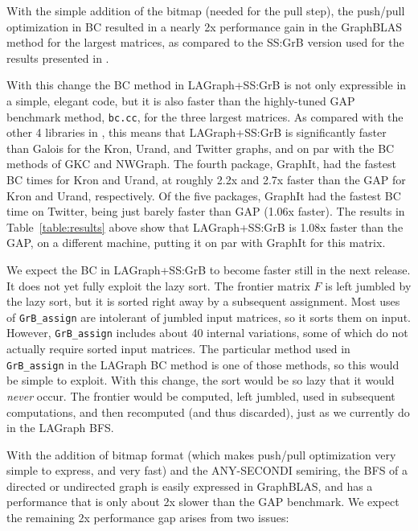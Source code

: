 
With the simple addition of the bitmap (needed for the pull step), the
push/pull optimization in BC resulted in a nearly 2x performance gain in the
GraphBLAS method for the largest matrices, as compared to the SS:GrB version
used for the results presented in \cite{DBLP:conf/iiswc/AzadABBCDDDDFGG20}.

With this change the BC method in LAGraph+SS:GrB is not only expressible in a
simple, elegant code, but it is also faster than the highly-tuned GAP benchmark
method, \verb'bc.cc', for the three largest matrices.  As compared with the
other 4 libraries in \cite{DBLP:conf/sc/BeamerAP12}, this means that
LAGraph+SS:GrB is significantly faster than Galois for the Kron, Urand, and
Twitter graphs, and on par with the BC methods of GKC and NWGraph.  The fourth
package, GraphIt, had the fastest BC times for Kron and Urand, at roughly 2.2x
and 2.7x faster than the GAP for Kron and Urand, respectively.  Of the five
packages, GraphIt had the fastest BC time on Twitter, being just barely faster
than GAP (1.06x faster).  The results in Table~\ref{table:results} above show
that LAGraph+SS:GrB is 1.08x faster than the GAP, on a different machine,
putting it on par with GraphIt for this matrix.

We expect the BC in LAGraph+SS:GrB to become faster still in the next
release.  It does not yet fully exploit the lazy sort.  The frontier matrix $F$
is left jumbled by the lazy sort, but it is sorted right away by a subsequent
assignment.  Most uses of \verb'GrB_assign' are intolerant of jumbled input
matrices, so it sorts them on input.  However, \verb'GrB_assign' includes
about 40 internal variations, some of which do not actually require sorted
input matrices.  The particular method used in \verb'GrB_assign' in the
LAGraph BC method is one of those methods, so this would be simple to exploit.
With this change, the sort would be so lazy that it would {\em never} occur.
The frontier would be computed, left jumbled, used in subsequent computations,
and then recomputed (and thus discarded), just as we currently do in the
LAGraph BFS.

With the addition of bitmap format (which makes push/pull optimization very
simple to express, and very fast) and the ANY-SECONDI semiring, the BFS of a
directed or undirected graph is easily expressed in GraphBLAS, and has a
performance that is only about 2x slower than the GAP benchmark.  We expect
the remaining 2x performance gap arises from two issues:

